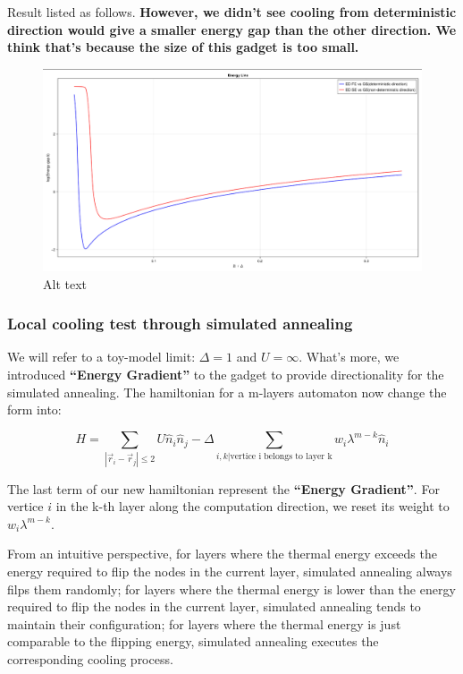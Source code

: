 \documentclass[twocolumn,superscriptaddress,english,showpacs,longbibliography]{revtex4-2}
\begin{document}
Result listed as follows. \textbf{However, we didn't see cooling from
deterministic direction would give a smaller energy gap than the other
direction. We think that's because the size of this gadget is too
small.}

\begin{figure}
\centering
\includegraphics[width=\columnwidth]{../notes/images/energy_gap_1_gadget.png}
\caption{Alt text}
\end{figure}

\subsubsection{Local cooling test through simulated
annealing}\label{local-cooling-test-through-simulated-annealing}

We will refer to a toy-model limit: $\Delta = 1$ and $U = \infty$.
What's more, we introduced \textbf{``Energy Gradient''} to the gadget to
provide directionality for the simulated annealing. The hamiltonian for
a m-layers automaton now change the form into:

\[
H = \sum_{|\vec r_i - \vec r_j|\leq 2} U \hat n_i \hat n_j  - \Delta \sum_{i,k|\text{vertice i belongs to layer k}} w_i \lambda^{m-k} \hat n_i
\]

The last term of our new hamiltonian represent the \textbf{``Energy
Gradient''}. For vertice $i$ in the k-th layer along the computation
direction, we reset its weight to $w_i\lambda^{m-k}$.

From an intuitive perspective, for layers where the thermal energy
exceeds the energy required to flip the nodes in the current layer,
simulated annealing always filps them randomly; for layers where the
thermal energy is lower than the energy required to flip the nodes in
the current layer, simulated annealing tends to maintain their
configuration; for layers where the thermal energy is just comparable to
the flipping energy, simulated annealing executes the corresponding
cooling process.
\end{document}
